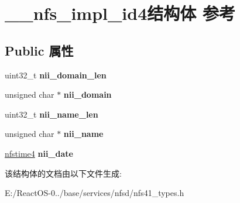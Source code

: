 \hypertarget{struct____nfs__impl__id4}{}\section{\+\_\+\+\_\+nfs\+\_\+impl\+\_\+id4结构体 参考}
\label{struct____nfs__impl__id4}
\subsection*{Public 属性}
\begin{DoxyCompactItemize}
\item 
\mbox{\label{struct____nfs__impl__id4_a91d4ea8c892c6f8a4d3521c9a402d003}} 
uint32\+\_\+t {\bfseries nii\+\_\+domain\+\_\+len}
\item 
\mbox{\label{struct____nfs__impl__id4_af48bd830a9ca56231c6b88627c5581a4}} 
unsigned char $\ast$ {\bfseries nii\+\_\+domain}
\item 
\mbox{\label{struct____nfs__impl__id4_a8100af2d8c0815fa6d10971b8bad1594}} 
uint32\+\_\+t {\bfseries nii\+\_\+name\+\_\+len}
\item 
\mbox{\label{struct____nfs__impl__id4_a6290cca25f3932fe8f25fb4641b86517}} 
unsigned char $\ast$ {\bfseries nii\+\_\+name}
\item 
\mbox{\label{struct____nfs__impl__id4_a1bf41212ccc97e2ba6ffdc9bee33b4ed}} 
\hyperlink{struct____nfstime4}{nfstime4} {\bfseries nii\+\_\+date}
\end{DoxyCompactItemize}


该结构体的文档由以下文件生成\+:\begin{DoxyCompactItemize}
\item 
E\+:/\+React\+O\+S-\/0../base/services/nfsd/nfs41\+\_\+types.\+h\end{DoxyCompactItemize}

